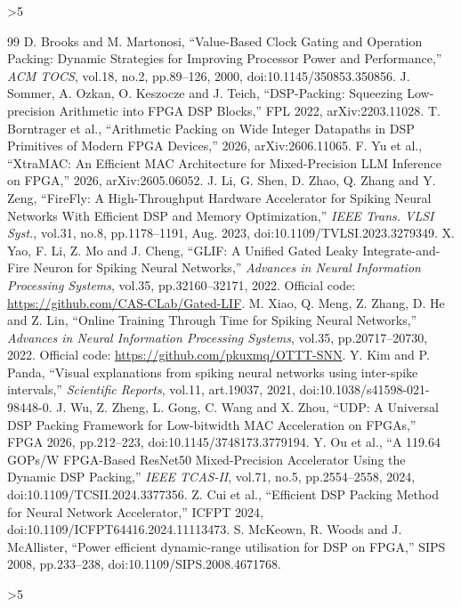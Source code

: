 \documentclass[conference]{IEEEtran}
\begin{document}
\clearpage
\ifnum\value{page}>5
\PackageError{manuscript}{Technical content exceeds four pages}{Shorten technical content; retain IEEE template dimensions.}
\fi
\begin{thebibliography}{99}
 D. Brooks and M. Martonosi, ``Value-Based Clock Gating and Operation Packing: Dynamic Strategies for Improving Processor Power and Performance,'' \emph{ACM TOCS}, vol.18, no.2, pp.89--126, 2000, doi:10.1145/350853.350856.
 J. Sommer, A. Ozkan, O. Keszocze and J. Teich, ``DSP-Packing: Squeezing Low-precision Arithmetic into FPGA DSP Blocks,'' FPL 2022, arXiv:2203.11028.
 T. Borntrager et al., ``Arithmetic Packing on Wide Integer Datapaths in DSP Primitives of Modern FPGA Devices,'' 2026, arXiv:2606.11065.
 F. Yu et al., ``XtraMAC: An Efficient MAC Architecture for Mixed-Precision LLM Inference on FPGA,'' 2026, arXiv:2605.06052.
 J. Li, G. Shen, D. Zhao, Q. Zhang and Y. Zeng, ``FireFly: A High-Throughput Hardware Accelerator for Spiking Neural Networks With Efficient DSP and Memory Optimization,'' \emph{IEEE Trans. VLSI Syst.}, vol.31, no.8, pp.1178--1191, Aug. 2023, doi:10.1109/TVLSI.2023.3279349.
 X. Yao, F. Li, Z. Mo and J. Cheng, ``GLIF: A Unified Gated Leaky Integrate-and-Fire Neuron for Spiking Neural Networks,'' \emph{Advances in Neural Information Processing Systems}, vol.35, pp.32160--32171, 2022. Official code: \url{https://github.com/CAS-CLab/Gated-LIF}.
 M. Xiao, Q. Meng, Z. Zhang, D. He and Z. Lin, ``Online Training Through Time for Spiking Neural Networks,'' \emph{Advances in Neural Information Processing Systems}, vol.35, pp.20717--20730, 2022. Official code: \url{https://github.com/pkuxmq/OTTT-SNN}.
 Y. Kim and P. Panda, ``Visual explanations from spiking neural networks using inter-spike intervals,'' \emph{Scientific Reports}, vol.11, art.19037, 2021, doi:10.1038/s41598-021-98448-0.
 J. Wu, Z. Zheng, L. Gong, C. Wang and X. Zhou, ``UDP: A Universal DSP Packing Framework for Low-bitwidth MAC Acceleration on FPGAs,'' FPGA 2026, pp.212--223, doi:10.1145/3748173.3779194.
 Y. Ou et al., ``A 119.64 GOPs/W FPGA-Based ResNet50 Mixed-Precision Accelerator Using the Dynamic DSP Packing,'' \emph{IEEE TCAS-II}, vol.71, no.5, pp.2554--2558, 2024, doi:10.1109/TCSII.2024.3377356.
 Z. Cui et al., ``Efficient DSP Packing Method for Neural Network Accelerator,'' ICFPT 2024, doi:10.1109/ICFPT64416.2024.11113473.
 S. McKeown, R. Woods and J. McAllister, ``Power efficient dynamic-range utilisation for DSP on FPGA,'' SIPS 2008, pp.233--238, doi:10.1109/SIPS.2008.4671768.
\end{thebibliography}
\ifnum\value{page}>5
\PackageError{manuscript}{Total content exceeds five pages}{Shorten references to fit the optional fifth page.}
\fi
\end{document}
